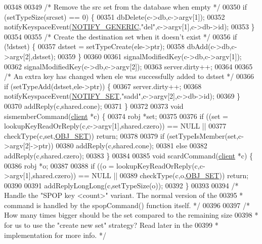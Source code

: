 \begin{DoxyCode}
00348 
00349     \textcolor{comment}{/* Remove the src set from the database when empty */}
00350     \textcolor{keywordflow}{if} (setTypeSize(srcset) == 0) \{
00351         dbDelete(c->db,c->argv[1]);
00352         notifyKeyspaceEvent(\hyperlink{server_8h_a9fa53dd1068e62365f3964ad3479eec2}{NOTIFY\_GENERIC},\textcolor{stringliteral}{"del"},c->argv[1],c->db->id);
00353     \}
00354 
00355     \textcolor{comment}{/* Create the destination set when it doesn't exist */}
00356     \textcolor{keywordflow}{if} (!dstset) \{
00357         dstset = setTypeCreate(ele->ptr);
00358         dbAdd(c->db,c->argv[2],dstset);
00359     \}
00360 
00361     signalModifiedKey(c->db,c->argv[1]);
00362     signalModifiedKey(c->db,c->argv[2]);
00363     server.dirty++;
00364 
00365     \textcolor{comment}{/* An extra key has changed when ele was successfully added to dstset */}
00366     \textcolor{keywordflow}{if} (setTypeAdd(dstset,ele->ptr)) \{
00367         server.dirty++;
00368         notifyKeyspaceEvent(\hyperlink{server_8h_a625aec945b2152a46979b1b21f2af274}{NOTIFY\_SET},\textcolor{stringliteral}{"sadd"},c->argv[2],c->db->id);
00369     \}
00370     addReply(c,shared.cone);
00371 \}
00372 
00373 \textcolor{keywordtype}{void} sismemberCommand(\hyperlink{structclient}{client} *c) \{
00374     robj *set;
00375 
00376     \textcolor{keywordflow}{if} ((set = lookupKeyReadOrReply(c,c->argv[1],shared.czero)) == NULL ||
00377         checkType(c,set,\hyperlink{server_8h_a8d179375a4aac33d3fa7aa80c8ccc75f}{OBJ\_SET})) \textcolor{keywordflow}{return};
00378 
00379     \textcolor{keywordflow}{if} (setTypeIsMember(set,c->argv[2]->ptr))
00380         addReply(c,shared.cone);
00381     \textcolor{keywordflow}{else}
00382         addReply(c,shared.czero);
00383 \}
00384 
00385 \textcolor{keywordtype}{void} scardCommand(\hyperlink{structclient}{client} *c) \{
00386     robj *o;
00387 
00388     \textcolor{keywordflow}{if} ((o = lookupKeyReadOrReply(c,c->argv[1],shared.czero)) == NULL ||
00389         checkType(c,o,\hyperlink{server_8h_a8d179375a4aac33d3fa7aa80c8ccc75f}{OBJ\_SET})) \textcolor{keywordflow}{return};
00390 
00391     addReplyLongLong(c,setTypeSize(o));
00392 \}
00393 
00394 \textcolor{comment}{/* Handle the "SPOP key <count>" variant. The normal version of the}
00395 \textcolor{comment}{ * command is handled by the spopCommand() function itself. */}
00396 
00397 \textcolor{comment}{/* How many times bigger should be the set compared to the remaining size}
00398 \textcolor{comment}{ * for us to use the "create new set" strategy? Read later in the}
00399 \textcolor{comment}{ * implementation for more info. */}

\end{DoxyCode}
